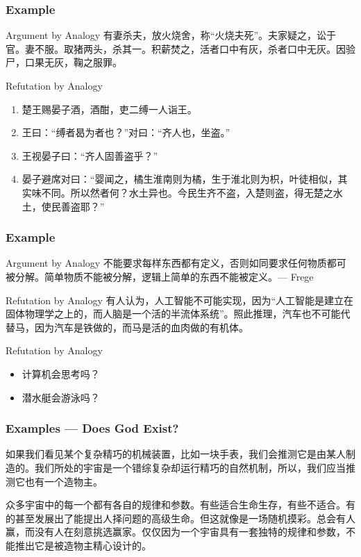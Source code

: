 \documentclass[UTF8,aspectratio=43,11pt,colorlinks,compress,openany]{beamer}%
\begin{document}
\begin{frame}\frametitle{Example}
\begin{block}{Argument by Analogy}
	有妻杀夫，放火烧舍，称“火烧夫死”。夫家疑之，讼于官。妻不服。取猪两头，杀其一。积薪焚之，活者口中有灰，杀者口中无灰。因验尸，口果无灰，鞠之服罪。
\end{block}
\begin{block}{Refutation by Analogy}
\begin{enumerate}
	\item 楚王赐晏子酒，酒酣，吏二缚一人诣王。
	\item 王曰：“缚者曷为者也？”对曰：“齐人也，坐盗。”
	\item 王视晏子曰：“齐人固善盗乎？”
	\item 晏子避席对曰：“婴闻之，橘生淮南则为橘，生于淮北则为枳，叶徒相似，其实味不同。所以然者何？水土异也。今民生齐不盗，入楚则盗，得无楚之水土，使民善盗耶？”
\end{enumerate}
\end{block}
\end{frame}

\begin{frame}\frametitle{Example}
	\begin{block}{Argument by Analogy}
		不能要求每样东西都有定义，否则如同要求任何物质都可被分解。简单物质不能被分解，逻辑上简单的东西不能被定义。\hfill --- Frege
	\end{block}
	\begin{block}{Refutation by Analogy}
		有人认为，人工智能不可能实现，因为“人工智能是建立在固体物理学之上的，而人脑是一个活的半流体系统”。照此推理，汽车也不可能代替马，因为汽车是铁做的，而马是活的血肉做的有机体。
	\end{block}
	\begin{block}{Refutation by Analogy}
		\begin{itemize}
			\item 计算机会思考吗？
			\item 潜水艇会游泳吗？
		\end{itemize}
	\end{block}
\end{frame}

\begin{frame}\frametitle{Examples --- Does God Exist?}
	\begin{block}{}
		如果我们看见某个复杂精巧的机械装置，比如一块手表，我们会推测它是由某人制造的。我们所处的宇宙是一个错综复杂却运行精巧的自然机制，所以，我们应当推测它也有一个造物主。
	\end{block}
	\begin{block}{}
		众多宇宙中的每一个都有各自的规律和参数。有些适合生命生存，有些不适合。有的甚至发展出了能提出人择问题的高级生命。但这就像是一场随机摸彩。总会有人赢，而没有人在刻意挑选赢家。仅仅因为一个宇宙具有一套独特的规律和参数，不能推出它是被造物主精心设计的。
	\end{block}
\end{frame}
\end{document}
